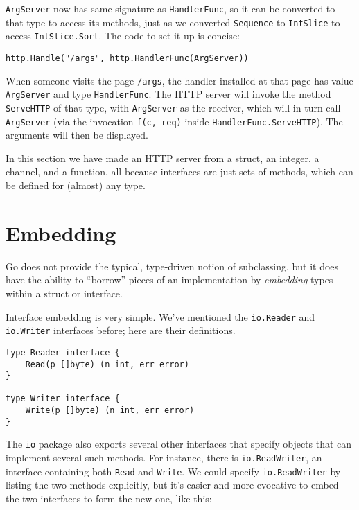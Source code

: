 \texttt{ArgServer} now has same signature as \texttt{HandlerFunc}, so it
can be converted to that type to access its methods, just as we
converted \texttt{Sequence} to \texttt{IntSlice} to access
\texttt{IntSlice.Sort}. The code to set it up is concise:

\begin{Verbatim}[frame=single]
http.Handle("/args", http.HandlerFunc(ArgServer))
\end{Verbatim}

When someone visits the page \texttt{/args}, the handler installed at
that page has value \texttt{ArgServer} and type \texttt{HandlerFunc}.
The HTTP server will invoke the method \texttt{ServeHTTP} of that type,
with \texttt{ArgServer} as the receiver, which will in turn call
\texttt{ArgServer} (via the invocation \texttt{f(c, req)} inside
\texttt{HandlerFunc.ServeHTTP}). The arguments will then be displayed.

In this section we have made an HTTP server from a struct, an integer, a
channel, and a function, all because interfaces are just sets of
methods, which can be defined for (almost) any type.

\section*{Embedding}

Go does not provide the typical, type-driven notion of subclassing, but
it does have the ability to ``borrow'' pieces of an implementation by
\emph{embedding} types within a struct or interface.

Interface embedding is very simple. We've mentioned the
\texttt{io.Reader} and \texttt{io.Writer} interfaces before; here are
their definitions.

\begin{Verbatim}[frame=single]
type Reader interface {
    Read(p []byte) (n int, err error)
}

type Writer interface {
    Write(p []byte) (n int, err error)
}
\end{Verbatim}

The \texttt{io} package also exports several other interfaces that
specify objects that can implement several such methods. For instance,
there is \texttt{io.ReadWriter}, an interface containing both
\texttt{Read} and \texttt{Write}. We could specify
\texttt{io.ReadWriter} by listing the two methods explicitly, but it's
easier and more evocative to embed the two interfaces to form the new
one, like this:


